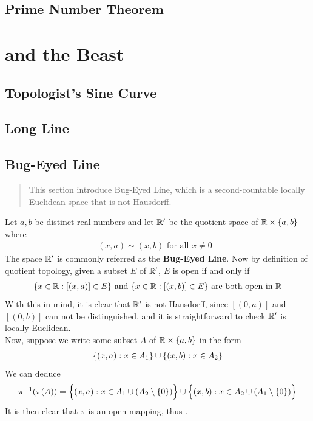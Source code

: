 \documentclass{report}
\begin{document}
\section{Prime Number Theorem}


\chapter{and the Beast}
\section{Topologist's Sine Curve}
\label{Topologist's Sine Curve}
\section{Long Line}
\label{Long Line}
\section{Bug-Eyed Line}
\label{Bug-Eyed Line}
\begin{abstract}
This section introduce Bug-Eyed Line, which is a second-countable locally Euclidean space that is not Hausdorff.
\end{abstract}
\begin{mdframed}
Let $a,b$ be distinct real numbers and let $\mathbb{R}'$ be the quotient space of $\mathbb{R}\times \{ a,b \}$ where 
\begin{align*}
  (x,a)\sim (x,b)\text{ for all $x\neq 0$ }
\end{align*}
The space $\mathbb{R}'$ is commonly referred as the  \textbf{Bug-Eyed Line}. Now by definition of quotient topology, given a subset $E$ of  $\mathbb{R}'$, $E $ is open if and only if 
\begin{align*}
  \{ x\in\mathbb{R}:[(x,a)]\in E \}\text{ and }\{ x\in\mathbb{R}:[(x,b)]\in E \}\text{ are both open in }\mathbb{R}
\end{align*}
With this in mind, it is clear that $\mathbb{R}'$ is not Hausdorff, since  $[(0,a)]$ and $[(0,b)]$ can not be distinguished, and it is straightforward to check $\mathbb{R}'$ is locally Euclidean.\\


Now, suppose we write some subset $A$ of $\mathbb{R}\times \{ a,b \}$ in the form  
\begin{align*}
\{ (x,a):x \in A_1 \}\cup  \{ (x,b):x \in A_2 \}
\end{align*}
We can deduce
\begin{align*}
\pi^{-1}(\pi (A))=\Big\{ (x,a): x\in A_1 \cup (A_2\setminus \{ 0 \}) \Big\}\cup  \Big\{ (x,b):x \in A_2 \cup  (A_1\setminus \{ 0 \}) \Big\}
\end{align*}
It is then clear that $\pi$ is an open mapping, thus .
\end{mdframed}
\end{document}
